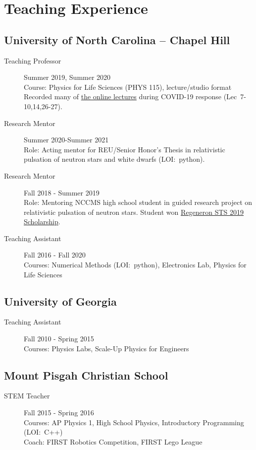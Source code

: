 \documentclass[11pt]{article}
\begin{document}
\section*{Teaching Experience}
\begin{minipage}{\textwidth}
\subsection*{University of North Carolina -- Chapel Hill}
	\begin{description}
		\item[Teaching Professor] Summer 2019, Summer 2020\\
			Course: Physics for Life Sciences (PHYS 115), lecture/studio format\\
			Recorded many of \href{https://www.youtube.com/playlist?list=PLGw8-QpmEugz6IxX75R1kvd9NM_53pQXV}{the online lectures} during COVID-19 response (Lec~7-10,14,26-27).
		\item[Research Mentor] Summer 2020-Summer 2021\\
		Role: Acting mentor for REU/Senior Honor's Thesis in relativistic pulsation of neutron stars and white dwarfs (LOI:~python).
		\item[Research Mentor] Fall 2018 - Summer 2019\\
			Role: Mentoring NCCMS high school student in guided research project on relativistic pulsation of neutron stars.  Student won \href{https://www.societyforscience.org/regeneron-sts/science-talent-search-2019/}{Regeneron STS 2019 Scholarship}.
		\item[Teaching Assistant] Fall 2016 - Fall 2020\\
			Courses: Numerical Methods (LOI:~python), Electronics Lab, Physics for Life Sciences
	\end{description}
	
\subsection*{University of Georgia}
	\begin{description}
		\item[Teaching Assistant] Fall 2010 - Spring 2015\\
			Courses: Physics Labs, Scale-Up Physics for Engineers
	\end{description}

\subsection*{Mount Pisgah Christian School}
	\begin{description}
		\item[STEM Teacher] Fall 2015 - Spring 2016\\
			Courses: AP Physics 1, High School Physics, Introductory Programming (LOI:~C++)\\
			Coach: FIRST Robotics Competition, FIRST Lego League
	\end{description}
\end{minipage}
\end{document}
